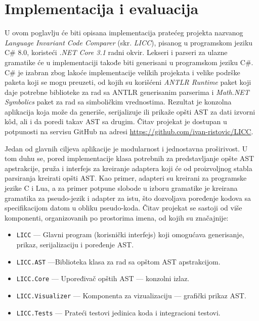 \chapter{Implementacija i evaluacija}
\label{chp:Implementation}

U ovom poglavlju će biti opisana implementacija pratećeg projekta nazvanog \emph{Language Invariant Code Comparer} (skr. \emph{LICC}), pisanog u programskom jeziku C\# 8.0, koristeći \emph{.NET Core 3.1} radni okvir. Lekseri i parseri za ulazne gramatike će u implementaciji takođe biti generisani u programskom jeziku C\#. C\# je izabran zbog lakoće implementacije velikih projekata i velike podrške paketa koji se mogu preuzeti, od kojih su korišćeni \emph{ANTLR Runtime} paket koji daje potrebne biblioteke za rad sa ANTLR generisanim parserima i \emph{Math.NET Symbolics} paket za rad sa simboličkim vrednostima. Rezultat je konzolna aplikacija koja može da generiše, serijalizuje ili prikaže opšti AST za dati izvorni k\^od, ali i da poredi takav AST sa drugim. Čitav projekat je dostupan u potpunosti na servisu GitHub na adresi \url{https://github.com/ivan-ristovic/LICC}.

Jedan od glavnih ciljeva aplikacije je modularnost i jednostavna proširivost. U tom duhu se, pored implementacije klasa potrebnih za predstavljanje opšte AST apstrakcije, pruža i interfejs za kreiranje adaptera koji će od proizvoljnog stabla parsiranja kreirati opšti AST. Kao primer, adapteri su kreirani za programske jezike C i Lua, a za primer potpune slobode u izboru gramatike je kreirana gramatika za pseudo-jezik i adapter za istu, što dozvoljava poređenje kodova sa specifikacijom datom u obliku pseudo-koda. Čitav projekat se sastoji od više komponenti, organizovanih po prostorima imena, od kojih su značajnije:
\begin{itemize}
    \item \texttt{LICC} --- Glavni program (korisnički interfejs) koji omogućava generisanje, prikaz, serijalizaciju i poređenje AST.
    \item \texttt{LICC.AST} ---Biblioteka klasa za rad sa opštom AST apstrakcijom.
    \item \texttt{LICC.Core} --- Upoređivač opštih AST --- konzolni izlaz.
    \item \texttt{LICC.Visualizer} --- Komponenta za vizualizaciju --- grafički prikaz AST.
    \item \texttt{LICC.Tests} --- Prateći testovi jedinica koda i integracioni testovi.
\end{itemize}

